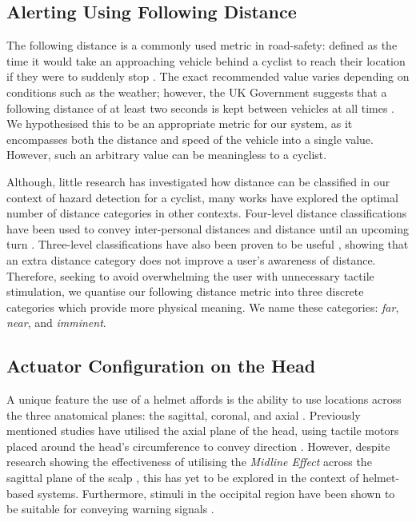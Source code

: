 \documentclass{mpaper}
\begin{document}
\subsection{Alerting Using Following Distance}
The following distance is a commonly used metric in road-safety: defined as the time it would take an approaching vehicle behind a cyclist to reach their location if they were to suddenly stop \cite{followdistancedef}. The exact recommended value varies depending on conditions such as the weather; however, the UK Government suggests that a following distance of at least two seconds is kept between vehicles at all times \cite{followdistance}. We hypothesised this to be an appropriate metric for our system, as it encompasses both the distance and speed of the vehicle into a single value. However, such an arbitrary value can be meaningless to a cyclist.

Although, little research has investigated how distance can be classified in our context of hazard detection for a cyclist, many works have explored the optimal number of distance categories in other contexts. Four-level distance classifications have been used to convey inter-personal distances \cite{10.1145/1520340.1520718, 10.1145/1753326.1753581} and distance until an upcoming turn \cite{10.1145/1868914.1868923}. Three-level classifications have also been proven to be useful \cite{10.1145/2556288.2557404}, showing that an extra distance category does not improve a user's awareness of distance. Therefore, seeking to avoid overwhelming the user with unnecessary tactile stimulation, we quantise our following distance metric into three discrete categories which provide more physical meaning. We name these categories: \textit{far}, \textit{near}, and \textit{imminent}.



\subsection{Actuator Configuration on the Head}\label{sec:helmet-design}
A unique feature the use of a helmet affords is the ability to use locations across the three anatomical planes: the sagittal, coronal, and axial \cite{anatomical}. Previously mentioned studies have utilised the axial plane of the head, using tactile motors placed around the head's circumference to convey direction \cite{10.1007/978-3-642-39802-5_3, yamauchi2020vibro, krauss2021head, 10.1145/3411763.3451580}. However, despite research showing the effectiveness of utilising the \textit{Midline Effect} across the sagittal plane of the scalp \cite{7463147, 1406917}, this has yet to be explored in the context of helmet-based systems. Furthermore, stimuli in the occipital region have been shown to be suitable for conveying warning signals \cite{7463147}. 
\end{document}
